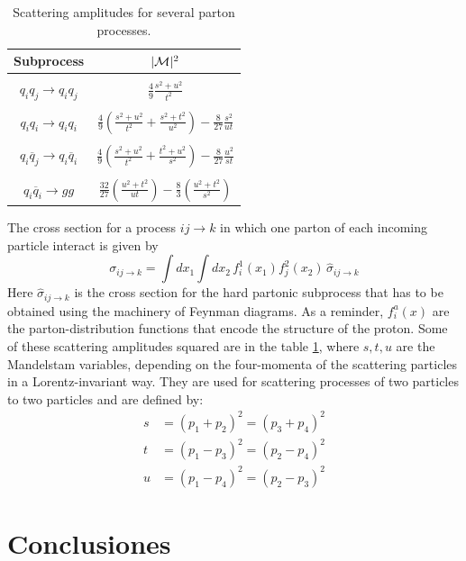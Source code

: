 \documentclass[11pt,a4paper,twoside,pdf]{article}
\numberwithin{equation}{section}
\newcommand{\dis}{\displaystyle}
\begin{document}
\begin{table}
\centering
\begin{tabular} {c|c}
Subprocess & $|{\cal{M}}|^2$ \\ \hline 
\\
$q_{i}q_{j}\rightarrow q_{i}q_{j}$ & $\dis\frac{4}{9}\dis\frac{s^2+u^2}{t^2}$ \\ \\
$q_{i}q_{i}\rightarrow q_{i}q_{i}$ & $\dis\frac{4}{9}\left(\dis\frac{s^2+u^2}{t^2}+\dis\frac{s^2+t^2}{u^2}\right)-\dis\frac{8}{27}\dis\frac{s^2}{ut}$ \\ \\
$q_{i}\overline{q}_j\rightarrow q_{i}\overline{q}_i$ &$\dis\frac{4}{9}\left(\dis\frac{s^2+u^2}{t^2}+\dis\frac{t^2+u^2}{s^2}\right)-\dis\frac{8}{27}\dis\frac{u^2}{st}$ \\ \\
$q_{i}\overline{q}_{i}\rightarrow gg$ & $\dis\frac{32}{27}\left(\dis\frac{u^2+t^2}{ut}\right)-\dis\frac{8}{3}\left(\dis\frac{u^2+t^2}{s^2}\right)$ 
\end{tabular}
\caption{Scattering amplitudes for several parton processes. \label{tabla1}}
\end{table}

The cross section for a process $ij\rightarrow k$ in which one parton of each incoming particle interact is given by \cite{PYTHIA}
\begin{equation}
\sigma_{ij\rightarrow k}=\int dx_{1} \int dx_{2}\, f_{i}^{1}(x_{1}) f_{j}^2(x_{2})\,\widehat{\sigma}_{ij\rightarrow k}
\end{equation}
Here $\widehat{\sigma}_{ij\rightarrow k}$ is the cross section for the hard partonic subprocess that has to be obtained using the machinery of Feynman diagrams. As a reminder, $f_{i}^{a}(x)$ are the parton-distribution functions
that encode the structure of the proton. Some of these scattering amplitudes squared are in the table \ref{tabla1}, where $s,t,u$ are the Mandelstam variables, depending on the four-momenta of the scattering particles in a Lorentz-invariant way. They are used for scattering processes of two particles to two particles and are defined by:
\begin{align}
s&=(p_1+p_2)^2=(p_3+p_4)^2 \\
t&=(p_1-p_3)^2=(p_2-p_4)^2 \\
u&=(p_1-p_4)^2=(p_2-p_3)^2
\end{align}

\section{Conclusiones}
\end{document}
